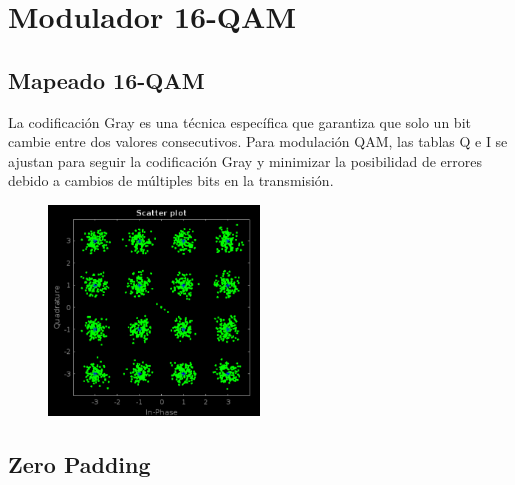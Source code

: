 \chapter{Modulador 16-QAM}
\label{section:qam}





\section*{Mapeado 16-QAM}







La codificación Gray es una técnica específica que garantiza que solo un bit cambie entre dos valores consecutivos. Para modulación QAM, las tablas Q e I se ajustan para seguir la codificación Gray y minimizar la posibilidad de errores debido a cambios de múltiples bits en la transmisión.

\vspace{3mm}

    \begin{figure}[h]
    	\centering
    	\includegraphics[width=0.5\textwidth]{img/matlab/qam.PNG}
    	\caption{}
    	\label{fig:qam}
    \end{figure}
    
\vspace{3mm}






\section*{Zero Padding}


